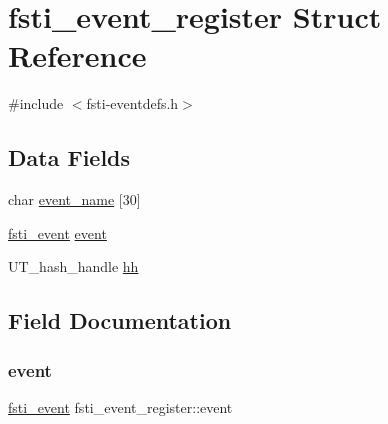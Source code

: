 \hypertarget{structfsti__event__register}{}\section{fsti\+\_\+event\+\_\+register Struct Reference}
\label{structfsti__event__register}


{\ttfamily \#include $<$fsti-\/eventdefs.\+h$>$}

\subsection*{Data Fields}
\begin{DoxyCompactItemize}
\item 
char \mbox{\hyperlink{structfsti__event__register_a53599c5b66b6ffb395ab8db972da363a}{event\+\_\+name}} \mbox{[}30\mbox{]}
\item 
\mbox{\hyperlink{fsti-eventdefs_8h_abce6b23e84620b4f4433c952fa10f0b9}{fsti\+\_\+event}} \mbox{\hyperlink{structfsti__event__register_af0894dde71c78fbcbb04733de4bd4857}{event}}
\item 
U\+T\+\_\+hash\+\_\+handle \mbox{\hyperlink{structfsti__event__register_a0e7eff8a88f39452ca3e25ef6616ebbf}{hh}}
\end{DoxyCompactItemize}


\subsection{Field Documentation}
\mbox{\label{structfsti__event__register_af0894dde71c78fbcbb04733de4bd4857}} 
\subsubsection{\texorpdfstring{event}{event}}
{\footnotesize\ttfamily \mbox{\hyperlink{fsti-eventdefs_8h_abce6b23e84620b4f4433c952fa10f0b9}{fsti\+\_\+event}} fsti\+\_\+event\+\_\+register\+::event}

\mbox{\label{structfsti__event__register_a53599c5b66b6ffb395ab8db972da363a}} 

